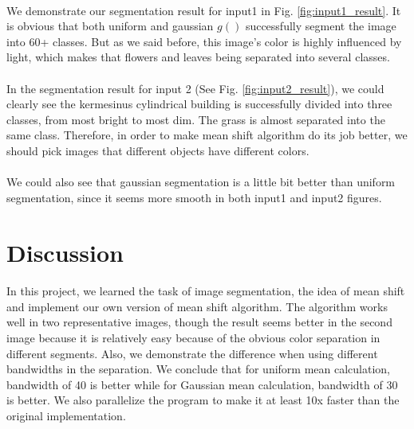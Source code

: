 \documentclass{gapd}
\begin{document}
\paragraph{}
	We demonstrate our segmentation result for input1 in Fig. \ref{fig:input1_result}. It is obvious that both uniform and gaussian $g()$ successfully segment the image into 60+ classes. But as we said before, this image's color is highly influenced by light, which makes that flowers and leaves being separated into several classes. 
\paragraph{}
	In the segmentation result for input 2 (See Fig. \ref{fig:input2_result}), we could clearly see the kermesinus cylindrical building is successfully divided into three classes, from most bright to most dim. The grass is almost separated into the same class. Therefore, in order to make mean shift algorithm do its job better, we should pick images that different objects have different colors. 
\paragraph{}
	We could also see that gaussian segmentation is a little bit better than uniform segmentation, since it seems more smooth in both input1 and input2 figures. 


\section{Discussion}
\label{sec:Discussion}
\paragraph{}
\lettrine{I}{}n this project, we learned the task of image segmentation, the idea of mean shift and implement our own version of mean shift algorithm. The algorithm works well in two representative images, though the result seems better in the second image because it is relatively easy because of the obvious color separation in different segments. Also, we demonstrate the difference when using different bandwidths in the separation. We conclude that for uniform mean calculation, bandwidth of 40 is better while for Gaussian mean calculation, bandwidth of 30 is better. We also parallelize the program to make it at least 10x faster than the original implementation. 
\end{document}
